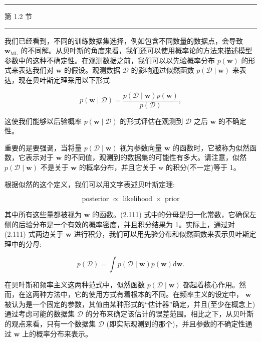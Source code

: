 \documentclass[10pt]{report}
\newcommand{\HRule}{\begin{center}\rule{0.9\linewidth}{0.2mm}\end{center}}
\begin{document}
\HRule

第 1.2 节

\HRule

我们已经看到，不同的训练数据集选择，例如包含不同数量的数据点，会导致 \({\mathbf{w}}_{\mathrm{{ML}}}\) 的不同解。从贝叶斯的角度来看，我们还可以使用概率论的方法来描述模型参数中的这种不确定性。在观测数据之前，我们可以以先验概率分布 \(p\left( \mathbf{w}\right)\) 的形式来表达我们对 \(\mathbf{w}\) 的假设。观测数据 \(\mathcal{D}\) 的影响通过似然函数 \(p\left( {\mathcal{D} \mid  \mathbf{w}}\right)\) 来表达，现在贝叶斯定理采用以下形式

\[
p\left( {\mathbf{w} \mid  \mathcal{D}}\right)  = \frac{p\left( {\mathcal{D} \mid  \mathbf{w}}\right) p\left( \mathbf{w}\right) }{p\left( \mathcal{D}\right) }, \tag{2.111}
\]

这使我们能够以后验概率 \(p\left( {\mathbf{w} \mid  \mathcal{D}}\right)\) 的形式评估在观测到 \(\mathcal{D}\) 之后 \(\mathbf{w}\) 的不确定性。

重要的是要强调，当将量 \(p\left( {\mathcal{D} \mid  \mathbf{w}}\right)\) 视为参数向量 \(\mathbf{w}\) 的函数时，它被称为似然函数，它表示对于 \(\mathbf{w}\) 的不同值，观测到的数据集的可能性有多大。请注意，似然 \(p\left( {\mathcal{D} \mid  \mathbf{w}}\right)\) 不是关于 \(\mathbf{w}\) 的概率分布，并且它关于 w 的积分(不一定)等于 1。

根据似然的这个定义，我们可以用文字表述贝叶斯定理:

\[
\text{ posterior } \propto  \text{ likelihood } \times  \text{ prior } \tag{2.112}
\]

其中所有这些量都被视为 \(\mathbf{w}\) 的函数。(2.111) 式中的分母是归一化常数，它确保左侧的后验分布是一个有效的概率密度，并且积分结果为 1。实际上，通过对 (2.111) 式两边关于 \(\mathbf{w}\) 进行积分，我们可以用先验分布和似然函数来表示贝叶斯定理中的分母:

\[
p\left( \mathcal{D}\right)  = \int p\left( {\mathcal{D} \mid  \mathbf{w}}\right) p\left( \mathbf{w}\right) \mathrm{d}\mathbf{w}. \tag{2.113}
\]

在贝叶斯和频率主义这两种范式中，似然函数 \(p\left( {\mathcal{D} \mid  \mathbf{w}}\right)\) 都起着核心作用。然而，在这两种方法中，它的使用方式有着根本的不同。在频率主义的设定中， \(\mathbf{w}\) 被认为是一个固定的参数，其值由某种形式的“估计器”确定，并且(至少在概念上)通过考虑可能的数据集 \(\mathcal{D}\) 的分布来确定该估计的误差范围。相比之下，从贝叶斯的观点来看，只有一个数据集 \(\mathcal{D}\) (即实际观测到的那个)，并且参数的不确定性通过 \(\mathbf{w}\) 上的概率分布来表示。
\end{document}
